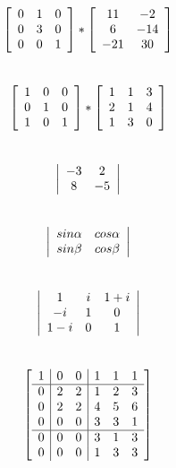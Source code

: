 \documentclass[12pt, letterpaper]{article}
\begin{document}
$$ 
\left[
\begin{array}{ c c c }
0 & 1 & 0 \\
0 & 3 & 0 \\
0 & 0 & 1 
\end{array}\right]
*
\left[
\begin{array}{c c}
11 & -2  \\
6 & -14  \\
-21 & 30 
\end{array}\right]
$$\\

$$
\left[\begin{array}{ c c c }
1 & 0 & 0 \\
0 & 1 & 0 \\
1 & 0 & 1 
\end{array}\right]
*
\left[\begin{array}{ c c c }
1 & 1 & 3 \\
2 & 1 & 4 \\
1 & 3 & 0 
\end{array}\right]
$$\\

$$
\left| \begin{array}{ c c }
-3 & 2  \\
8 & -5  \\
\end{array}\right|
$$\\

$$
\left| \begin{array}{ c c }
 sin\alpha & cos\alpha \\
 sin\beta & cos\beta
\end{array}\right|
$$\\

$$
\left| \begin{array}{ c c c }
1 & i & 1+i \\
-i & 1 & 0 \\
1-i & 0 & 1
\end{array}\right|
$$\\

$$
\left[ \begin{array}{ c | c c | c c c }
1 & 0 & 0 & 1 & 1 & 1 \\ \hline
0 & 2 & 2 & 1 & 2 & 3 \\
0 & 2 & 2 & 4 & 5 & 6 \\
0 & 0 & 0 & 3 & 3 & 1 \\ \hline
0 & 0 & 0 & 3 & 1 & 3 \\
0 & 0 & 0 & 1 & 3 & 3 \\
\end{array}\right]
$$\\
\end{document}
